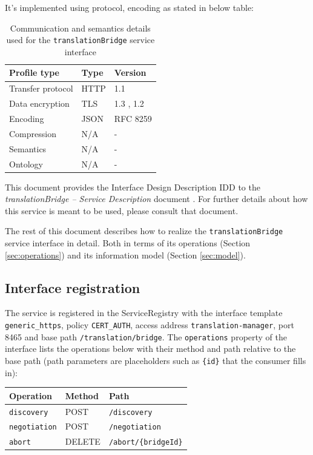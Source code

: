 \documentclass[a4paper]{arrowhead}
\begin{document}
It's implemented using protocol, encoding as stated in below table:
\begin{table}[ht!]
  \centering
  \begin{tabular}{|l|l|l|}
    \hline
    \rowcolor{gray!33} Profile type & Type & Version \\ \hline
    Transfer protocol & HTTP & 1.1 \cite{rfc9112} \\ \hline
    Data encryption & TLS & 1.3 \cite{rfc8446}, 1.2 \cite{rfc5246} \\ \hline
    Encoding & JSON & RFC 8259 \cite{rfc8259} \\ \hline
    Compression & N/A & - \\ \hline
    Semantics & N/A & - \\ \hline
    Ontology & N/A & - \\ \hline
  \end{tabular}
  \caption{Communication and semantics details used for the \texttt{translationBridge} service interface}
  \label{tab:comunication_semantics_profile}
\end{table}

This document provides the Interface Design Description IDD to the \textit{translationBridge -- Service Description} document \cite{tm-translationBridge-sd}.
For further details about how this service is meant to be used, please consult that document.

The rest of this document describes how to realize the \texttt{translationBridge} service
interface in detail. Both in terms of its operations (Section \ref{sec:operations}) and its information model (Section \ref{sec:model}).

\subsection{Interface registration}

The service is registered in the ServiceRegistry with the interface template \texttt{generic\_\allowbreak{}https}, policy \texttt{CERT\_\allowbreak{}AUTH}, access address \texttt{translation-\allowbreak{}manager}, port 8465 and base path \texttt{/\allowbreak{}translation/\allowbreak{}bridge}. The \texttt{operations} property of the interface lists the operations below with their method and path relative to the base path (path parameters are placeholders such as \texttt{\{id\}} that the consumer fills in):

\noindent\begin{longtable}{| p{5.2cm} | p{1.6cm} | p{8.4cm} |} \hline
\rowcolor{gray!33} Operation & Method & Path \\ \hline \endhead
\texttt{discovery} & POST & \texttt{/\allowbreak{}discovery} \\ \hline
\texttt{negotiation} & POST & \texttt{/\allowbreak{}negotiation} \\ \hline
\texttt{abort} & DELETE & \texttt{/\allowbreak{}abort/\allowbreak{}\{bridgeId\}} \\ \hline
\end{longtable}
\end{document}
